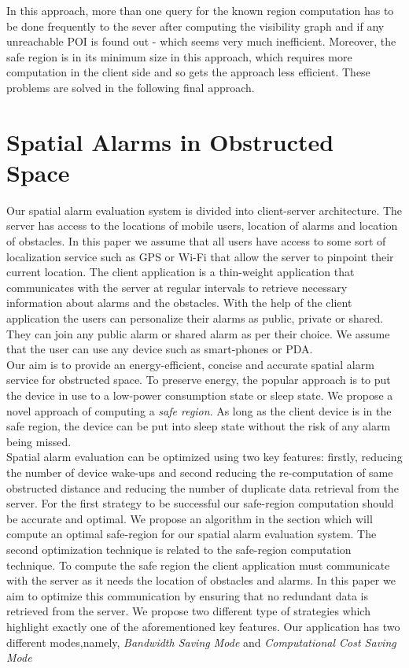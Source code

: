 \documentclass{sig-alternate}
\begin{document}
In this approach, more than one query for the known region computation has to be done frequently to the sever after computing the visibility graph and if any unreachable POI is found out - which seems very much inefficient. Moreover, the safe region is in its minimum size in this approach, which requires more computation in the client side and so gets the approach less efficient. These problems are solved in the following final approach.


\section{Spatial Alarms in Obstructed Space}
Our spatial alarm evaluation system is divided into client-server architecture. The server has access to the locations of mobile users, location of alarms and location of obstacles. In this paper we assume that all users have access to some sort of localization service such as GPS or Wi-Fi that allow the server to pinpoint their current location. The client application is a thin-weight application that communicates with the server at regular intervals to retrieve necessary information about alarms and the obstacles. With the help of the client application the users can personalize their alarms as public, private or shared. They can join any public alarm or shared alarm as per their choice. We assume that the user can use any device such as smart-phones or PDA.\\ Our aim is to provide an energy-efficient, concise and accurate spatial alarm service for obstructed space. To preserve energy, the popular approach is to put the device in use to a low-power consumption state or sleep state. We propose a novel approach of computing a \textit{safe region}. As long as the client device is in the safe region, the device can be put into sleep state without the risk of any alarm being missed. \\


Spatial alarm evaluation can be optimized using two key features: firstly, reducing the number of device wake-ups and second reducing the re-computation of same obstructed distance and reducing the number of duplicate data retrieval from the server. For the first strategy to be successful our safe-region computation should be accurate and optimal. We propose an algorithm in the section which will compute an optimal safe-region for our spatial alarm evaluation system. The second optimization technique is related to the safe-region computation technique. To compute the safe region the client application must communicate with the server as it needs the location of obstacles and alarms. In this paper we aim to optimize this communication by ensuring that no redundant data is retrieved from the server. We propose two different type of strategies which highlight exactly one of the aforementioned key features. Our application has two different modes,namely, \textit{Bandwidth Saving Mode} and \textit{Computational Cost Saving Mode}
\end{document}
